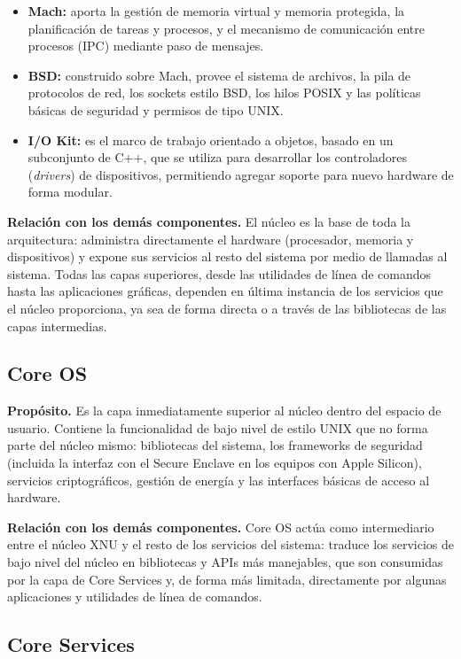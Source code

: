 \documentclass[12pt,letterpaper]{article}
\begin{document}
\begin{itemize}[nosep]
    \item \textbf{Mach:} aporta la gestión de memoria virtual y memoria protegida, la planificación de tareas y procesos, y el mecanismo de comunicación entre procesos (IPC) mediante paso de mensajes.
    \item \textbf{BSD:} construido sobre Mach, provee el sistema de archivos, la pila de protocolos de red, los sockets estilo BSD, los hilos POSIX y las políticas básicas de seguridad y permisos de tipo UNIX.
    \item \textbf{I/O Kit:} es el marco de trabajo orientado a objetos, basado en un subconjunto de C++, que se utiliza para desarrollar los controladores (\textit{drivers}) de dispositivos, permitiendo agregar soporte para nuevo hardware de forma modular.
\end{itemize}

\textbf{Relación con los demás componentes.} El núcleo es la base de toda la arquitectura: administra directamente el hardware (procesador, memoria y dispositivos) y expone sus servicios al resto del sistema por medio de llamadas al sistema. Todas las capas superiores, desde las utilidades de línea de comandos hasta las aplicaciones gráficas, dependen en última instancia de los servicios que el núcleo proporciona, ya sea de forma directa o a través de las bibliotecas de las capas intermedias.

\subsection{Core OS}

\textbf{Propósito.} Es la capa inmediatamente superior al núcleo dentro del espacio de usuario. Contiene la funcionalidad de bajo nivel de estilo UNIX que no forma parte del núcleo mismo: bibliotecas del sistema, los frameworks de seguridad (incluida la interfaz con el Secure Enclave en los equipos con Apple Silicon), servicios criptográficos, gestión de energía y las interfaces básicas de acceso al hardware.

\textbf{Relación con los demás componentes.} Core OS actúa como intermediario entre el núcleo XNU y el resto de los servicios del sistema: traduce los servicios de bajo nivel del núcleo en bibliotecas y APIs más manejables, que son consumidas por la capa de Core Services y, de forma más limitada, directamente por algunas aplicaciones y utilidades de línea de comandos.

\subsection{Core Services}
\end{document}
